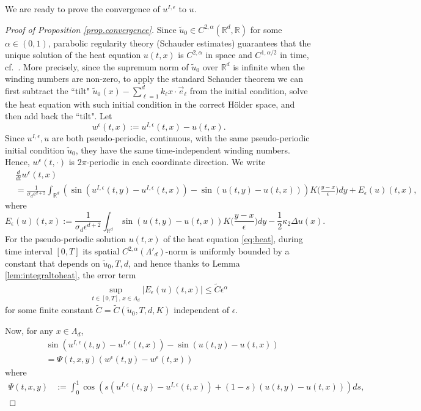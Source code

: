 \documentclass[a4paper,11pt]{amsart}
\newcommand{\red}[1]{{#1}}
\newcommand{\R}{\mathbb{R}}
\newcommand{\ep}{\epsilon}
\numberwithin{equation}{section}
\numberwithin{theorem}{section}
\theoremstyle{definition}
\begin{document}
We are ready to prove the convergence of $u^{I,\ep}$ to $u$.

\begin{proof}[Proof of Proposition \ref{prop.convergence}]
Since $\tilde u_0\in C^{2, \alpha}(\R^d,\R)$ for some $\alpha\in(0,1)$, parabolic regularity theory (Schauder estimates) guarantees that the unique solution of the heat equation $u(t,x)$ is $C^{2,\alpha}$ in space and $C^{1,\alpha/2}$ in time, cf.~\cite[Theorem 9.1.2]{krylov}. \red{More precisely, since the supremum norm of $\tilde u_0$ over $\R^d$ is infinite when the winding numbers are non-zero, to apply the standard Schauder theorem we can first subtract the ``tilt" $\tilde u_0(x)-\sum_{\ell=1}^d k_\ell x\cdot\vec e_\ell$ from the initial condition, solve the heat equation with such initial condition in the correct H\"older space, and then add back the ``tilt".}
Let 
\[
w^\ep(t,x):=u^{I,\ep}(t,x)-u(t,x). 
\]
\red{Since $u^{I,\ep}, u$ are both pseudo-periodic, continuous, with the same pseudo-periodic initial condition $\tilde u_0$, they have the same time-independent winding numbers. Hence, $w^\ep(t,\cdot)$ is $2\pi$-periodic in each coordinate direction.}
We write
\begin{align*}
&\frac{d}{dt}w^\ep(t,x)\\
&= \frac{1}{\sigma_d\ep^{d+2}}\int_{\R^d}\left(\sin\left(u^{I,\ep}(t,y)-u^{I,\ep}(t,x)\right)-\sin\left(u(t,y)-u(t,x)\right)\right)K\Big(\frac{y-x}{\ep}\Big)dy + E_\ep(u)(t,x),
\end{align*}
where
\begin{equation}\label{eq:error}
E_\ep(u)(t,x):=\frac{1}{\sigma_d\ep^{d+2}}\int_{\R^d}\sin\left(u(t,y)-u(t,x)\right)K\Big(\frac{y-x}{\ep}\Big)dy-\frac{1}{2}\kappa_2\Delta u(x). %
\end{equation}
For the pseudo-periodic solution $u(t,x)$ of the heat equation \eqref{eq:heat}, during time interval $[0,T]$ its spatial $C^{2,\alpha}(\Lambda'_d)$-norm is uniformly bounded by a constant that depends on $\tilde u_0, T, d$, and hence thanks to Lemma \ref{lem:integraltoheat}, the error term 
\begin{align}\label{bound:error}
\sup_{t\in[0,T], \, x\in\Lambda_d}|E_\ep(u)(t,x)|\le \tilde C\ep^\alpha
\end{align}
for some finite constant $\tilde C=\tilde C(\tilde u_0,T, d, K)$ independent of $\ep$. 

Now, for any $x\in\Lambda_d$, 
\begin{align*}
&\sin\left(u^{I,\ep}(t,y)-u^{I,\ep}(t,x)\right)-\sin\left(u(t,y)-u(t,x)\right)\\
&=\Psi(t, x,y)\left(w^\ep(t,y)-w^\ep(t,x)\right)
\end{align*}
where 
\begin{align*}
\Psi(t, x,y)&:=\int_0^1\cos \left(s\left(u^{I,\ep}(t,y)-u^{I,\ep}(t,x)\right)+(1-s)\left(u(t,y)-u(t,x)\right)\right)ds,
\end{align*}


\end{proof}
\end{document}
